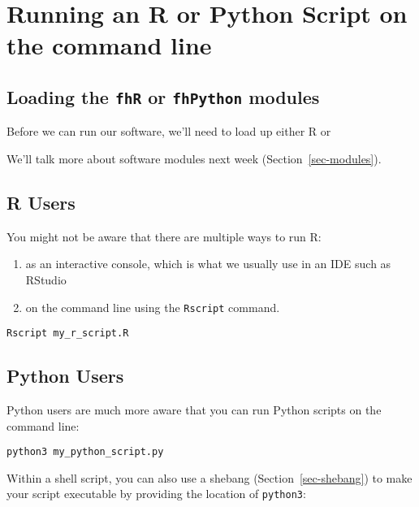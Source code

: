 \documentclass[
  letterpaper,
  DIV=11,
  numbers=noendperiod]{scrreprt}
\providecommand{\tightlist}{%
  \setlength{\itemsep}{0pt}\setlength{\parskip}{0pt}}
\begin{document}
\section{Running an R or Python Script on the command
line}\label{running-an-r-or-python-script-on-the-command-line}

\subsection{\texorpdfstring{Loading the \texttt{fhR} or
\texttt{fhPython}
modules}{Loading the fhR or fhPython modules}}\label{loading-the-fhr-or-fhpython-modules}

Before we can run our software, we'll need to load up either R or

We'll talk more about software modules next week
(Section~\ref{sec-modules}).

\subsection{R Users}\label{r-users}

You might not be aware that there are multiple ways to run R:

\begin{enumerate}
\def\labelenumi{\arabic{enumi})}
\tightlist
\item
  as an interactive console, which is what we usually use in an IDE such
  as RStudio
\item
  on the command line using the \texttt{Rscript} command.
\end{enumerate}

\begin{verbatim}
Rscript my_r_script.R
\end{verbatim}

\subsection{Python Users}\label{python-users}

Python users are much more aware that you can run Python scripts on the
command line:

\begin{verbatim}
python3 my_python_script.py
\end{verbatim}

Within a shell script, you can also use a shebang
(Section~\ref{sec-shebang}) to make your script executable by providing
the location of \texttt{python3}:
\end{document}
